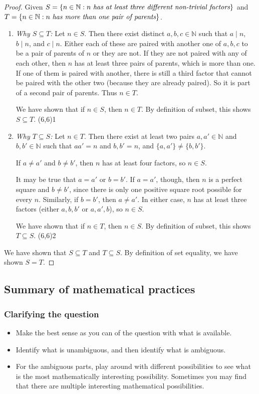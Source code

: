 \documentclass[11pt]{article}
\newcommand\tn{\textnormal}
\newcommand{\N}{\mathbb{N}}
\renewcommand\subset\subseteq
\newcommand\st{:}
\newcommand\divides{\;|\;}
\theoremstyle{definition}
\newcommand\qedpart[1]{ \hfill \framebox(6,6){\tiny #1}}
\begin{document}
\begin{proof}
Given $S=\{ n\in \N\st n\tn{ \it has at least three different non-trivial factors}\}$ and $T=\{ n\in \N \st n \tn{ \it has more than one pair of parents}\}$.
\begin{enumerate}
\item {\it Why $S\subset T$:} 
Let $n\in S$. Then there exist distinct $a, b, c \in \N$ such that $a\divides n$, $b\divides n$, and $c\divides n$. Either each of these are paired with another one of $a,b,c$ to be a pair of parents of $n$ or they are not. If they are not paired with any of each other, then $n$ has at least three pairs of parents, which is more than one. If one of them is paired with another, there is still a third factor that cannot be paired with the other two (because they are already paired). So it is part of a second pair of parents. Thus $n\in T$.


We have shown that if $n\in S$, then $n\in T$. By definition of subset, this shows $S\subset T$. \qedpart{1}

\item {\it Why $T\subset S$:} 
Let $n\in T$. Then there exist at least two pairs $a, a'\in \N$ and $b, b'\in \N$ such that $aa'=n$ and $b,b'=n$, and $\{a,a'\} \neq \{b, b'\}$.

If $a\neq a'$ and $b\neq b'$, then $n$ has at least four factors, so $n\in S$.

It may be true that $a=a'$ or $b=b'$. If $a=a'$, though, then $n$ is a perfect square and $b\neq b'$, since there is only one positive square root possible for every $n$. Similarly, if $b=b'$, then $a\neq a'$. In either case, $n$ has at least three factors (either $a, b, b'$ or $a, a', b$), so $n\in S$.

We have shown that if $n\in T$, then $n\in S$. By definition of subset, this shows $T\subset S$. \qedpart{2}
\end{enumerate}
We have shown that $S\subset T$ and $T\subset S$. By definition of set equality, we have shown $S=T$.
\end{proof}

\subsection{Summary of mathematical practices}
 
 
\subsubsection*{Clarifying the question}
 \begin{itemize}
 \item Make the best sense as you can of the question with what is available.
 \item Identify what is unambiguous, and then identify what is ambiguous.
 \item For the ambiguous parts, play around with different possibilities to see what is the most mathematically interesting possibility. Sometimes you may find that there are multiple interesting mathematical possibilities.
 \end{itemize}
\end{document}
